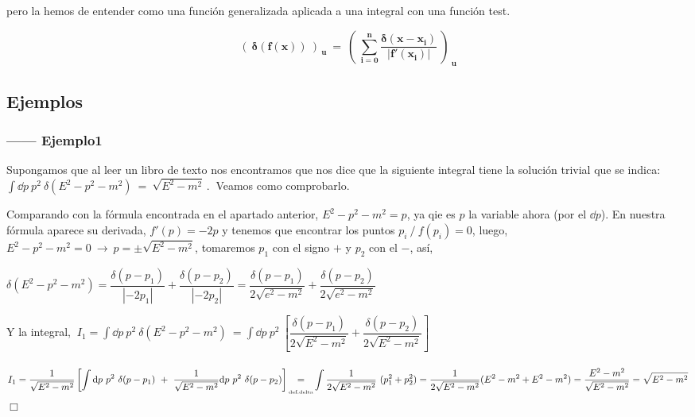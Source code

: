 pero la hemos de entender como una función generalizada aplicada a una integral con una función test.

$$\boldsymbol{ \left( \  \delta(f(x)) \ \right)_{\ u} \ = \ \displaystyle \left( \  \sum_{i=0}^n \dfrac{\delta(x-x_i)}{|f'(x_i)|} \ \right )_{\ u} }$$


\vspace{0.5cm}
\subsection{Ejemplos}
\vspace{0.5cm}
\subsubsection{------ Ejemplo1}

Supongamos que al leer un libro de texto nos encontramos que nos dice que la siguiente integral tiene la solución trivial que se indica:
$\displaystyle \int \dd p \ p^2 \ \delta(E^2-p^2-m^2) \ = \ \sqrt{E^2-m^2} \, . \ $ Veamos como comprobarlo.

Comparando con la fórmula encontrada en el apartado anterior, $E^2-p^2-m^2=p$, ya qie es $p$ la variable ahora (por el $\dd p$). En nuestra fórmula aparece su derivada, $f'(p)=-2p$ y tenemos que encontrar los puntos $p_i \ / \ f(p_i)=0$, luego, $E^2-p^2-m^2= 0 \ \to \ p=\pm \sqrt{E^2-m^2}$, tomaremos $p_1$ con el signo $+$ y $p_2$ con el $-$, así,

$\delta(E^2-p^2-m^2)=\dfrac{\delta(p-p_1)}{|-2p_1|}+\dfrac{\delta(p-p_2)}{|-2p_2|}=\dfrac{\delta(p-p_1)}{2\sqrt{e^2-m^2}}+\dfrac{\delta(p-p_2)}{2\sqrt{e^2-m^2}}$

Y la integral, $\ \displaystyle I_1=\int \dd p \ p^2 \ \delta(E^2-p^2-m^2) \ = \int \dd p \ p^2 \ \left[ \dfrac{\delta(p-p_1)}{2\sqrt{E^2-m^2}}+\dfrac{\delta(p-p_2)}{2\sqrt{E^2-m^2}} \right] $

$I_1=\displaystyle \dfrac 1{\sqrt{E^2-m^2}}  \left[
\int \dd p \ p^2 \ \delta(p-p_1) \ + \ \dfrac 1{\sqrt{E^2-m^2}}\dd p \ p^2 \ \delta(p-p_2) \right]
\begin{matrix} \\ = \\ \text{\tiny{def.delta}} \end{matrix} 
\int \dfrac 1{2\sqrt{E^2-m^2}} \ (p_1^2+p_2^2)=\dfrac1{2\sqrt{E^2-m^2}} (E^2-m^2+E^2-m^2)= \dfrac {E^2-m^2}{\sqrt{E^2-m^2}}=\sqrt{E^2-m^2}$ \hspace{6cm} $\Box$




